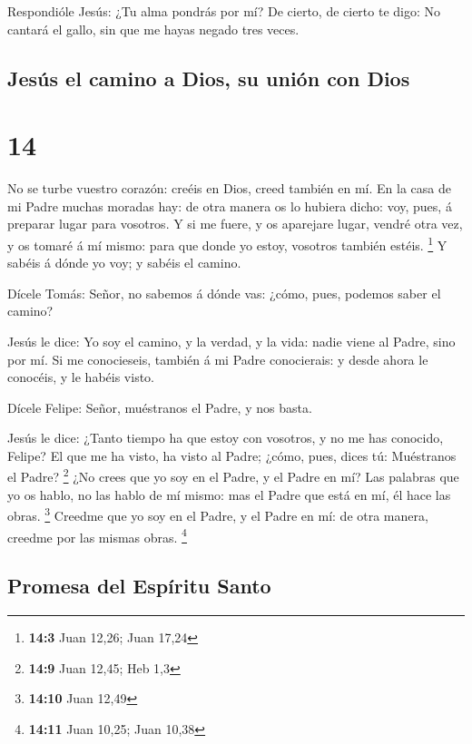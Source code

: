  Respondióle Jesús: ¿Tu alma pondrás por mí? De cierto, de
cierto te digo: No cantará el gallo, sin que me hayas negado tres veces.

\hypertarget{jesuxfas-el-camino-a-dios-su-uniuxf3n-con-dios}{%
\subsection{Jesús el camino a Dios, su unión con
Dios}\label{jesuxfas-el-camino-a-dios-su-uniuxf3n-con-dios}}

\hypertarget{section-13}{%
\section{14}\label{section-13}}

 No se turbe vuestro corazón: creéis en Dios, creed también
en mí.  En la casa de mi Padre muchas moradas hay: de otra
manera os lo hubiera dicho: voy, pues, á preparar lugar para vosotros.
 Y si me fuere, y os aparejare lugar, vendré otra vez, y os
tomaré á mí mismo: para que donde yo estoy, vosotros también estéis.
\footnote{\textbf{14:3} Juan 12,26; Juan 17,24}  Y sabéis á
dónde yo voy; y sabéis el camino.

 Dícele Tomás: Señor, no sabemos á dónde vas: ¿cómo, pues,
podemos saber el camino?

 Jesús le dice: Yo soy el camino, y la verdad, y la vida:
nadie viene al Padre, sino por mí.  Si me conocieseis,
también á mi Padre conocierais: y desde ahora le conocéis, y le habéis
visto.

 Dícele Felipe: Señor, muéstranos el Padre, y nos basta.

 Jesús le dice: ¿Tanto tiempo ha que estoy con vosotros, y
no me has conocido, Felipe? El que me ha visto, ha visto al Padre;
¿cómo, pues, dices tú: Muéstranos el Padre? \footnote{\textbf{14:9} Juan
  12,45; Heb 1,3}  ¿No crees que yo soy en el Padre, y el
Padre en mí? Las palabras que yo os hablo, no las hablo de mí mismo: mas
el Padre que está en mí, él hace las obras. \footnote{\textbf{14:10}
  Juan 12,49}  Creedme que yo soy en el Padre, y el Padre
en mí: de otra manera, creedme por las mismas obras. \footnote{\textbf{14:11}
  Juan 10,25; Juan 10,38}

\hypertarget{promesa-del-espuxedritu-santo}{%
\subsection{Promesa del Espíritu
Santo}\label{promesa-del-espuxedritu-santo}}

